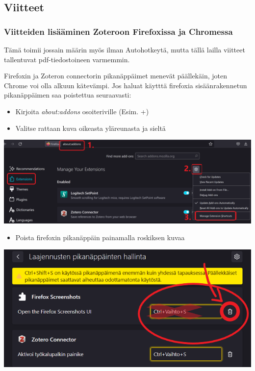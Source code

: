 \documentclass[a4paper,12pt]{scrartcl}
\begin{document}
\subsection{Viitteet}

\subsubsection{Viitteiden lisääminen Zoteroon Firefoxissa ja Chromessa}

Tämä toimii jossain määrin myös ilman Autohotkeytä, mutta tällä lailla viitteet tallentuvat pdf-tiedostoineen varmemmin.

Firefoxin ja Zoteron connectorin pikanäppäimet menevät päällekäin, joten Chrome voi olla alkuun kätevämpi. Jos haluat käytttä firefoxia sisäänrakennetun pikanäppäimen saa poistettua seuraavasti:
\begin{itemize}
	\item Kirjoita \emph{about:addons} osoiteriville (Esim. +)
	\item Valitse rattaan kuva oikeasta yläreunasta ja sieltä 
\end{itemize} 

\includegraphics[width=\textwidth]{img/firefox1}
\begin{itemize}
	\item Poista firefoxin pikanäppäin painamalla roskiksen kuvaa
\end{itemize}
\includegraphics[width=\textwidth]{img/firefox2}
\end{document}
